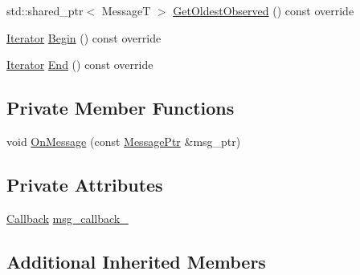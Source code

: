 \begin{DoxyCompactItemize}
\item 
std\-::shared\-\_\-ptr$<$ Message\-T $>$ \hyperlink{classapollo_1_1cyber_1_1blocker_1_1IntraReader_a4ecd786720ee58f0b53cee186f0a4713}{Get\-Oldest\-Observed} () const override
\item 
\hyperlink{classapollo_1_1cyber_1_1blocker_1_1IntraReader_a34f048290fe0ff40e672a485835ccfc9}{Iterator} \hyperlink{classapollo_1_1cyber_1_1blocker_1_1IntraReader_a9249758337ab94e2aefe657f1f8a3580}{Begin} () const override
\item 
\hyperlink{classapollo_1_1cyber_1_1blocker_1_1IntraReader_a34f048290fe0ff40e672a485835ccfc9}{Iterator} \hyperlink{classapollo_1_1cyber_1_1blocker_1_1IntraReader_ab94a92e11479f932b99f1c2e1f2df931}{End} () const override
\end{DoxyCompactItemize}
\subsection*{Private Member Functions}
\begin{DoxyCompactItemize}
\item 
void \hyperlink{classapollo_1_1cyber_1_1blocker_1_1IntraReader_a4310e459238cf6c5c23dab4b96236f2e}{On\-Message} (const \hyperlink{classapollo_1_1cyber_1_1blocker_1_1IntraReader_aa4e9071f397bee80ba4ab42e7d1f165d}{Message\-Ptr} \&msg\-\_\-ptr)
\end{DoxyCompactItemize}
\subsection*{Private Attributes}
\begin{DoxyCompactItemize}
\item 
\hyperlink{classapollo_1_1cyber_1_1blocker_1_1IntraReader_a15cf88ac9399d324aeb685bec11c8afe}{Callback} \hyperlink{classapollo_1_1cyber_1_1blocker_1_1IntraReader_adf1bc681d8decbd80ba6a69039f1851b}{msg\-\_\-callback\-\_\-}
\end{DoxyCompactItemize}
\subsection*{Additional Inherited Members}


